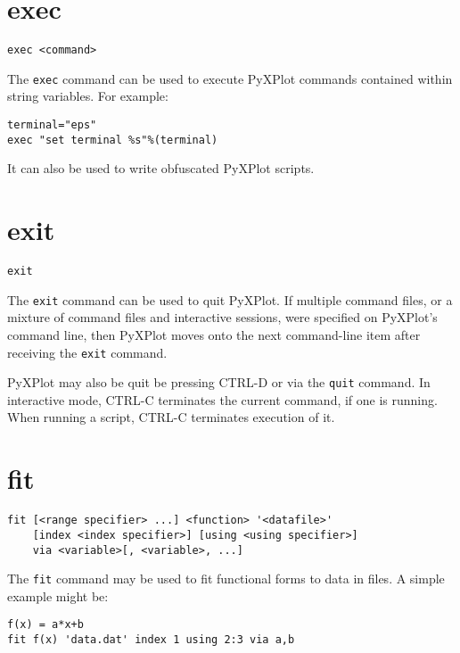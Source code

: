 \section{exec}

\begin{verbatim}
exec <command>
\end{verbatim}

The {\tt exec} command can be used to execute PyXPlot commands contained within
string variables. For example:

\begin{verbatim}
terminal="eps"
exec "set terminal %s"%(terminal)
\end{verbatim}

It can also be used to write obfuscated PyXPlot scripts.

\section{exit}

\begin{verbatim}
exit
\end{verbatim}

The {\tt exit} command can be used to quit PyXPlot. If multiple command files,
or a mixture of command files and interactive sessions, were specified on
PyXPlot's command line, then PyXPlot moves onto the next command-line item
after receiving the {\tt exit} command.

PyXPlot may also be quit be pressing CTRL-D or via the {\tt quit} command. In
interactive mode, CTRL-C terminates the current command, if one is running.
When running a script, CTRL-C terminates execution of it.


\section{fit}

\begin{verbatim}
fit [<range specifier> ...] <function> '<datafile>'
    [index <index specifier>] [using <using specifier>]
    via <variable>[, <variable>, ...]
\end{verbatim}

The {\tt fit} command may be used to fit functional forms to data in
files. A simple example might be:

\begin{verbatim}
f(x) = a*x+b
fit f(x) 'data.dat' index 1 using 2:3 via a,b
\end{verbatim}

